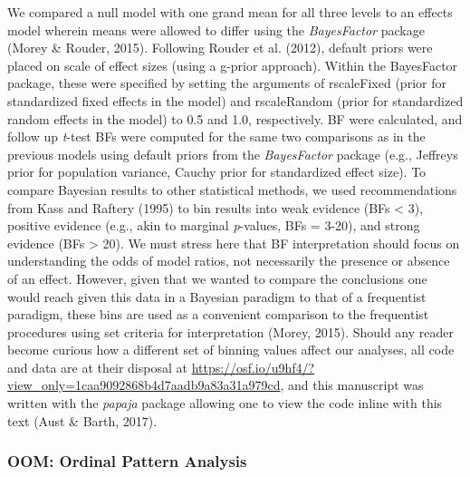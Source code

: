 \documentclass[,man, mask]{apa6}
\theoremstyle{definition}
\theoremstyle{definition}
\theoremstyle{definition}
\theoremstyle{remark}
\begin{document}
We compared a null model with one grand mean for all three levels to an
effects model wherein means were allowed to differ using the
\emph{BayesFactor} package (Morey \& Rouder, 2015). Following Rouder et
al. (2012), default priors were placed on scale of effect sizes (using a
g-prior approach). Within the BayesFactor package, these were specified
by setting the arguments of rscaleFixed (prior for standardized fixed
effects in the model) and rscaleRandom (prior for standardized random
effects in the model) to 0.5 and 1.0, respectively. BF were calculated,
and follow up \emph{t}-test BFs were computed for the same two
comparisons as in the previous models using default priors from the
\emph{BayesFactor} package (e.g., Jeffreys prior for population
variance, Cauchy prior for standardized effect size). To compare
Bayesian results to other statistical methods, we used recommendations
from Kass and Raftery (1995) to bin results into weak evidence (BFs
\textless{} 3), positive evidence (e.g., akin to marginal
\emph{p}-values, BFs = 3-20), and strong evidence (BFs \textgreater{}
20). We must stress here that BF interpretation should focus on
understanding the odds of model ratios, not necessarily the presence or
absence of an effect. However, given that we wanted to compare the
conclusions one would reach given this data in a Bayesian paradigm to
that of a frequentist paradigm, these bins are used as a convenient
comparison to the frequentist procedures using set criteria for
interpretation (Morey, 2015). Should any reader become curious how a
different set of binning values affect our analyses, all code and data
are at their disposal at
\url{https://osf.io/u9hf4/?view_only=1caa9092868b4d7aadb9a83a31a979cd},
and this manuscript was written with the \emph{papaja} package allowing
one to view the code inline with this text (Aust \& Barth, 2017).

\subsubsection{OOM: Ordinal Pattern
Analysis}\label{oom-ordinal-pattern-analysis}
\end{document}
